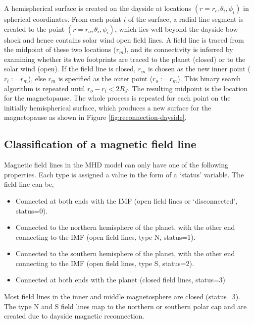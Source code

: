 A hemispherical surface is created on the dayside at locations $(r=r_i, \theta_i, \phi_i)$ in spherical coordinates. From each point $i$ of the surface, a radial line segment is created to the point $(r=r_o, \theta_i, \phi_i)$, which lies well beyond the dayside bow shock and hence contains solar wind open field lines. A field line is traced from the midpoint of these two locations ($r_m$), and its connectivity is inferred by examining whether its two footprints are traced to the planet (closed) or to the solar wind (open). If the field line is closed, $r_m$ is chosen as the new inner point ($r_i:=r_m$), else $r_m$ is specified as the outer point ($r_o:=r_m$). This binary search algorithm is repeated until $r_o - r_i < 2 R_J$. The resulting midpoint is the location for the magnetopause. The whole process is repeated for each point on the initially hemispherical surface, which produces a new surface for the magnetopause as shown in Figure \ref{fig:reconnection-dayside}. 

\subsection{Classification of a magnetic field line}
Magnetic field lines in the MHD model can only have one of the following properties. Each type is assigned a value in the form of a `status' variable. The field line can be, 

\begin{itemize}
    \item Connected at both ends with the IMF (open field lines or `disconnected', status=0).
    \item Connected to the northern hemisphere of the planet, with the other end connecting to the IMF (open field lines, type N, status=1). 
    \item Connected to the southern hemisphere of the planet, with the other end connecting to the IMF (open field lines, type S, status=2).
    \item Connected at both ends with the planet (closed field lines, status=3)
\end{itemize}

Most field lines in the inner and middle magnetosphere are closed (status=3). The type N and S field lines map to the northern or southern polar cap and are created due to dayside magnetic reconnection.

